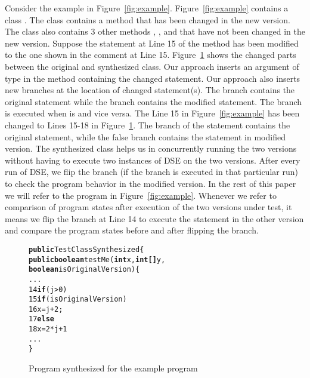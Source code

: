 	Consider the example in Figure~\ref{fig:example}. Figure~\ref{fig:example} contains a class . The class  contains a method  that has been changed in the new version. The class also contains 3 other methods , , and  that have not been changed in the new version. Suppose the statement at Line 15 of the method  has been modified to the one shown in the comment at Line 15.
	Figure~\ref{fig:Changed} shows the changed parts between the original and synthesized class. Our approach inserts an argument  of type  in the method containing the changed statement. Our approach also inserts new branches at the location of changed statement(s). The  branch contains the original statement while the  branch contains the modified statement. The  branch is executed when  is  and vice versa. The Line 15 in Figure~\ref{fig:example} has been changed to Lines 15-18 in Figure~\ref{fig:Changed}. The  branch of the  statement contains the original statement, while the false branch contains the statement in modified version. The synthesized class  helps us in concurrently running the two versions without having to execute two instances of DSE on the two versions. After every run of DSE, we flip the  branch (if the branch is executed in that particular run) to check the program behavior in the modified version. In the rest of this paper we will refer to the program in Figure~\ref{fig:example}. Whenever we refer to comparison of program states after execution of the two versions under test, it means we flip the branch at Line 14 to execute the statement in the other version and compare the program states before and after flipping the branch.
	
	\begin{figure}[t]
\begin{CodeOut}
\begin{alltt}
  \textbf{public} TestClassSynthesized\{
  \hspace{0.5cm}\textbf{public boolean} testMe(\textbf{int }x, \textbf{int[] } y, 
  \hspace{3cm}\textbf{boolean} isOriginalVersion)\{
  \hspace{2.0cm} ...
14\hspace{2.0cm} \textbf{if}(j > 0)
15\hspace{2.5cm} \textbf{if}(isOriginalVersion)	 
16\hspace{3.0cm} x = j+2;
17\hspace{2.5cm} \textbf{else}
18\hspace{3.0cm} x = 2*j+1
  \hspace{2.0cm} ...
  \}
\end{alltt}
\end{CodeOut}
\vspace{-0.15 in}
\caption{Program synthesized for the example program}
\label{fig:Changed}
\end{figure}

